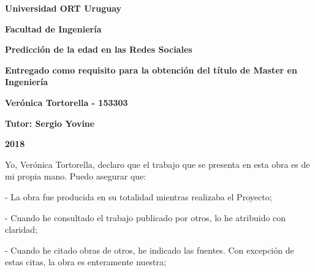 \documentclass[12pt,a4paper,oneside]{book}
\begin{document}


\vspace*{\fill}

\begin{center}

\begin{Large}
\textbf{Universidad ORT Uruguay}

\textbf{Facultad de Ingeniería}
\bigskip\bigskip\bigskip\bigskip\bigskip\bigskip
\end{Large}

\begin{huge}

\textbf{Predicción de la edad en las Redes Sociales}
\end{huge}    
\bigskip\bigskip\bigskip\bigskip\bigskip\bigskip


\begin{Large}
\textbf{Entregado como requisito para la obtención del título de
Master en Ingeniería}
\end{Large}
\bigskip\bigskip\bigskip\bigskip\bigskip\bigskip\bigskip\bigskip

\begin{Large}
\textbf{Verónica Tortorella - 153303}
\bigskip

\textbf{Tutor: Sergio Yovine}
\bigskip\bigskip\bigskip\bigskip\bigskip\bigskip
\end{Large}

\begin{huge}
\textbf{2018}
\end{huge}

\end{center}
\vspace*{\fill}

\thispagestyle{empty}
\newpage
\vspace*{\fill}
Yo, Verónica Tortorella, declaro que el trabajo que se presenta en esta obra es de mi
propia mano. Puedo asegurar que:

- La obra fue producida en su totalidad mientras realizaba el Proyecto;

- Cuando he consultado el trabajo publicado por otros, lo he atribuido con claridad;

- Cuando he citado obras de otros, he indicado las fuentes. Con excepción de estas citas, la obra es enteramente nuestra;
\end{document}
